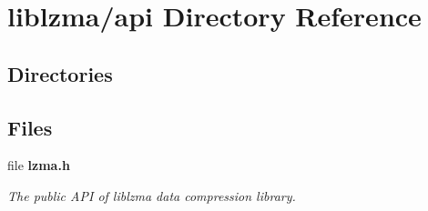 \section{liblzma/api Directory Reference}
\label{dir_3c7592c36b11e0fd373edb6a27c72b1d}
\subsection*{Directories}
\begin{DoxyCompactItemize}
\end{DoxyCompactItemize}
\subsection*{Files}
\begin{DoxyCompactItemize}
\item 
file \textbf{ lzma.\+h}
\begin{DoxyCompactList}\small\item\em The public A\+PI of liblzma data compression library. \end{DoxyCompactList}\end{DoxyCompactItemize}
